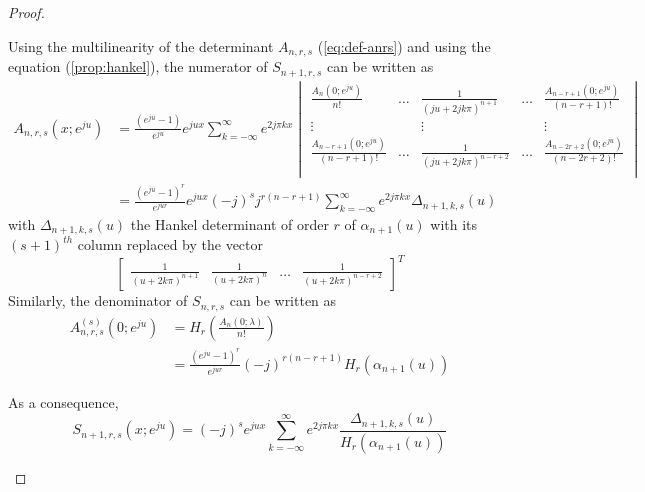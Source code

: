 \begin{proof}
\begin{enumerate}
    Using the multilinearity of the determinant $A_{n,r,s}$ (\ref{eq:def-anrs}) and using the equation 
    (\ref{prop:hankel}), the numerator of $S_{n+1,r,s}$ can be written as 
    \begin{align*}
      A_{n,r,s}(x;e^{ju}) &= \frac{(e^{ju}-1)}{e^{ju}}e^{jux} \sum_{k=-\infty}^{\infty} e^{2j\pi kx}
      \begin{vmatrix}
	\frac{A_n(0;e^{ju})}{n!}  &  \hdots & \frac{1}{{(ju+2jk\pi)}^{n+1}} & \hdots &  
	\frac{A_{n-r+1}(0;e^{ju})}{(n-r+1)!} \\
	\vdots & & \vdots & & \vdots \\
	\frac{A_{n-r+1}(0;e^{ju})}{(n-r+1)!}  & \hdots & \frac{1}{{(ju+2jk\pi)}^{n-r+2}} & \hdots &  
	\frac{A_{n-2r+2}(0;e^{ju})}{(n-2r+2)!} \\
      \end{vmatrix} \\
      &= \frac{{(e^{ju}-1)}^r}{e^{jur}}e^{jux} {(-j)}^{s} j^{r(n-r+1)} \sum_{k=-\infty}^{\infty} e^{2j\pi kx} 
      \Delta_{n+1,k,s}(u)
    \end{align*}
    with $\Delta_{n+1,k,s}(u)$ the Hankel determinant of order $r$ of $\alpha_{n+1}(u)$ with its ${(s+1)}^{th}$ column 
    replaced by the vector
    \begin{equation*}
      \begin{bmatrix} \frac{1}{{(u+2k\pi)}^{n+1}} & \frac{1}{{(u+2k\pi)}^{n}} & \hdots & \frac{1}{{(u+2k\pi)}^{n-r+2}} 
      \end{bmatrix}^T
    \end{equation*}
    Similarly, the denominator of $S_{n,r,s}$ can be written as 
    \begin{align*}
      A^{(s)}_{n,r,s}(0;e^{ju}) &= H_r\left(\frac{A_n(0;\lambda)}{n!}\right) \\
      & = \frac{{(e^{ju}-1)}^r}{e^{jur}}{(-j)}^{r(n-r+1)} H_r(\alpha_{n+1}(u))
    \end{align*}

    As a consequence, \begin{equation}\label{eq:exp-s2mrs}
      S_{n+1,r,s}(x;e^{ju}) = {(-j)}^s e^{jux} \sum_{k=-\infty}^{\infty}  e^{2j\pi kx} 
      \frac{\Delta_{n+1,k,s}(u)}{H_r(\alpha_{n+1}(u))}
    \end{equation}


\end{enumerate}
\end{proof}
